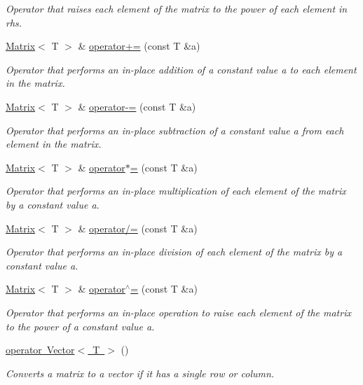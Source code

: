 \begin{DoxyCompactItemize}
\begin{DoxyCompactList}\small\item\em Operator that raises each element of the matrix to the power of each element in {\ttfamily rhs}. \end{DoxyCompactList}\item 
\mbox{\hyperlink{classMatrix}{Matrix}}$<$ T $>$ \& \mbox{\hyperlink{classMatrix_a5aeaf1a90547b2288646d57143d5518c}{operator+=}} (const T \&a)
\begin{DoxyCompactList}\small\item\em Operator that performs an in-\/place addition of a constant value {\ttfamily a} to each element in the matrix. \end{DoxyCompactList}\item 
\mbox{\hyperlink{classMatrix}{Matrix}}$<$ T $>$ \& \mbox{\hyperlink{classMatrix_a8776d41fcbbc1fc08425492576cf6786}{operator-\/=}} (const T \&a)
\begin{DoxyCompactList}\small\item\em Operator that performs an in-\/place subtraction of a constant value {\ttfamily a} from each element in the matrix. \end{DoxyCompactList}\item 
\mbox{\hyperlink{classMatrix}{Matrix}}$<$ T $>$ \& \mbox{\hyperlink{classMatrix_a9ac358ade86c1b442aa75852b2dd663a}{operator$\ast$=}} (const T \&a)
\begin{DoxyCompactList}\small\item\em Operator that performs an in-\/place multiplication of each element of the matrix by a constant value {\ttfamily a}. \end{DoxyCompactList}\item 
\mbox{\hyperlink{classMatrix}{Matrix}}$<$ T $>$ \& \mbox{\hyperlink{classMatrix_ada3039797826038262e03da2ee3a8697}{operator/=}} (const T \&a)
\begin{DoxyCompactList}\small\item\em Operator that performs an in-\/place division of each element of the matrix by a constant value {\ttfamily a}. \end{DoxyCompactList}\item 
\mbox{\hyperlink{classMatrix}{Matrix}}$<$ T $>$ \& \mbox{\hyperlink{classMatrix_af35faeb39342bf42c4470cf10630e32f}{operator$^\wedge$=}} (const T \&a)
\begin{DoxyCompactList}\small\item\em Operator that performs an in-\/place operation to raise each element of the matrix to the power of a constant value {\ttfamily a}. \end{DoxyCompactList}\item 
\mbox{\hyperlink{classMatrix_a8d390e8b2581c65774f58a0a3b716dcb}{operator Vector$<$ T $>$}} ()
\begin{DoxyCompactList}\small\item\em Converts a matrix to a vector if it has a single row or column. \end{DoxyCompactList}\end{DoxyCompactItemize}


